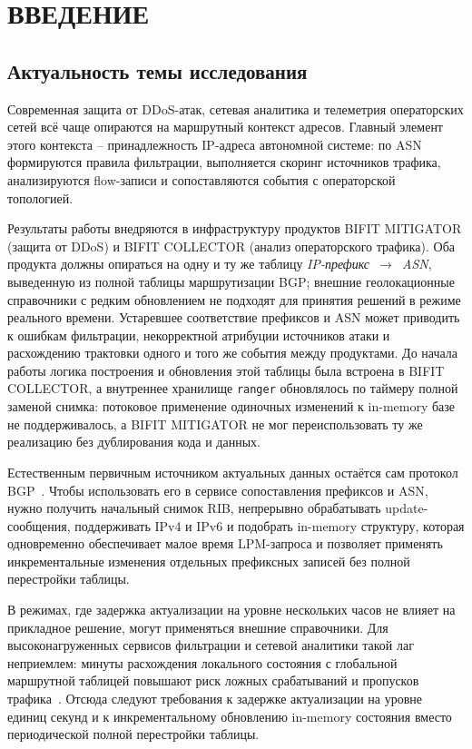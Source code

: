 \section*{ВВЕДЕНИЕ}

\subsection*{Актуальность темы исследования}

Современная защита от DDoS-атак, сетевая аналитика и телеметрия
операторских сетей всё чаще опираются на маршрутный контекст адресов.
Главный элемент этого контекста -- принадлежность IP-адреса автономной
системе: по ASN формируются правила фильтрации, выполняется скоринг
источников трафика, анализируются flow-записи и сопоставляются события с
операторской топологией.

Результаты работы внедряются в инфраструктуру продуктов BIFIT
MITIGATOR (защита от DDoS) и BIFIT COLLECTOR (анализ операторского
трафика). Оба продукта должны опираться на одну и ту же таблицу
\textit{IP-префикс~$\rightarrow$~ASN}, выведенную из полной таблицы
маршрутизации BGP; внешние геолокационные справочники с редким
обновлением не подходят для принятия решений в режиме реального времени.
Устаревшее соответствие префиксов и ASN может приводить к ошибкам
фильтрации, некорректной атрибуции источников атаки и расхождению
трактовки одного и того же события между продуктами. До начала работы
логика построения и обновления этой таблицы была встроена в BIFIT
COLLECTOR, а внутреннее хранилище \texttt{ranger} обновлялось по таймеру
полной заменой снимка: потоковое применение одиночных изменений к
in-memory базе не поддерживалось, а BIFIT MITIGATOR не мог
переиспользовать ту же реализацию без дублирования кода и данных.

Естественным первичным источником актуальных данных остаётся сам
протокол BGP~\cite{rfc4271}. Чтобы использовать его в сервисе
сопоставления префиксов и ASN, нужно получить начальный снимок RIB,
непрерывно обрабатывать
update-сообщения, поддерживать IPv4 и IPv6 и подобрать in-memory
структуру, которая одновременно обеспечивает малое время LPM-запроса и
позволяет применять инкрементальные изменения отдельных префиксных
записей без полной перестройки таблицы.

В режимах, где задержка актуализации на уровне нескольких часов не
влияет на прикладное решение, могут применяться внешние справочники.
Для высоконагруженных сервисов фильтрации и сетевой аналитики такой
лаг неприемлем: минуты расхождения локального состояния с глобальной
маршрутной таблицей повышают риск ложных срабатываний и пропусков
трафика~\cite{labovitz1997instability,labovitz2000convergence}.
Отсюда следуют требования к задержке актуализации на уровне единиц
секунд и к инкрементальному обновлению in-memory состояния вместо
периодической полной перестройки таблицы.

